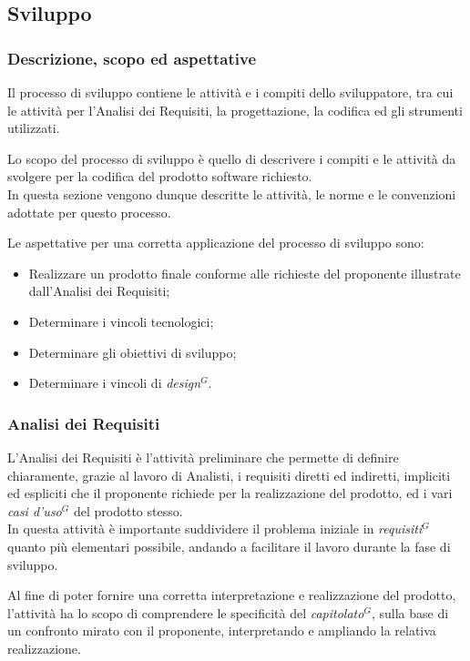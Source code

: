 \subsection{Sviluppo}

\subsubsection{Descrizione, scopo ed aspettative}

Il processo di sviluppo contiene le attività e i compiti dello sviluppatore, tra cui le attività per l’Analisi dei Requisiti, la progettazione, la codifica ed gli strumenti utilizzati.

Lo scopo del processo di sviluppo è quello di descrivere i compiti e le attività da svolgere per la codifica del prodotto software richiesto. \\
In questa sezione vengono dunque descritte le attività, le norme e le convenzioni adottate per questo processo.

Le aspettative per una corretta applicazione del processo di sviluppo sono:
\begin{itemize}
    \item Realizzare un prodotto finale conforme alle richieste del proponente illustrate dall'Analisi dei Requisiti;
    \item Determinare i vincoli tecnologici;
    \item Determinare gli obiettivi di sviluppo;
    \item Determinare i vincoli di \emph{design}$^{G}$.
\end{itemize}
\subsubsection{Analisi dei Requisiti}


L’Analisi dei Requisiti è l’attività preliminare che permette di definire chiaramente, grazie al lavoro di Analisti, i requisiti diretti ed indiretti,
impliciti ed espliciti che il proponente richiede per la realizzazione del prodotto, ed i vari \emph{casi d’uso}$^{G}$ del prodotto stesso. \\
In questa attività è importante suddividere il problema iniziale in \emph{requisiti}$^{G}$ quanto più elementari possibile, andando a facilitare il lavoro durante la fase di sviluppo.

Al fine di poter fornire una corretta interpretazione e realizzazione del prodotto, l'attività ha lo scopo di comprendere le specificità del \emph{capitolato}$^{G}$, sulla base di un confronto mirato con il proponente, interpretando e ampliando la relativa realizzazione.
\pagebreak

